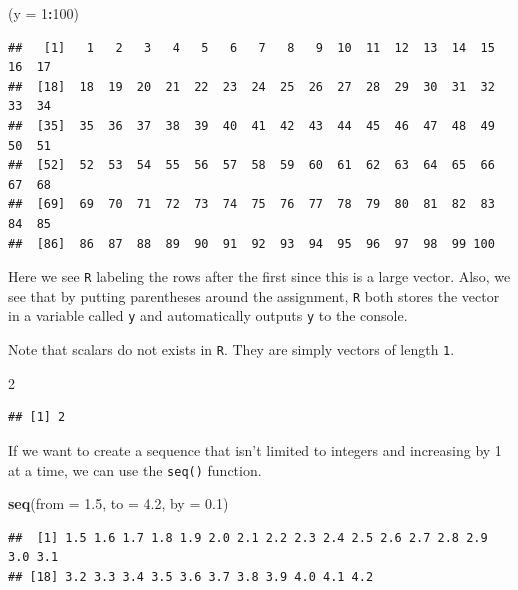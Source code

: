 \documentclass[]{book}
\newenvironment{Shaded}{\begin{snugshade}}{\end{snugshade}}
\newcommand{\KeywordTok}[1]{\textcolor[rgb]{0.13,0.29,0.53}{\textbf{#1}}}
\newcommand{\DataTypeTok}[1]{\textcolor[rgb]{0.13,0.29,0.53}{#1}}
\newcommand{\DecValTok}[1]{\textcolor[rgb]{0.00,0.00,0.81}{#1}}
\newcommand{\FloatTok}[1]{\textcolor[rgb]{0.00,0.00,0.81}{#1}}
\newcommand{\OperatorTok}[1]{\textcolor[rgb]{0.81,0.36,0.00}{\textbf{#1}}}
\newcommand{\NormalTok}[1]{#1}
\theoremstyle{definition}
\theoremstyle{definition}
\theoremstyle{definition}
\theoremstyle{remark}
\begin{document}
\begin{Shaded}
\begin{Highlighting}[]
\NormalTok{(}\DataTypeTok{y =} \DecValTok{1}\OperatorTok{:}\DecValTok{100}\NormalTok{)}
\end{Highlighting}
\end{Shaded}

\begin{verbatim}
##   [1]   1   2   3   4   5   6   7   8   9  10  11  12  13  14  15  16  17
##  [18]  18  19  20  21  22  23  24  25  26  27  28  29  30  31  32  33  34
##  [35]  35  36  37  38  39  40  41  42  43  44  45  46  47  48  49  50  51
##  [52]  52  53  54  55  56  57  58  59  60  61  62  63  64  65  66  67  68
##  [69]  69  70  71  72  73  74  75  76  77  78  79  80  81  82  83  84  85
##  [86]  86  87  88  89  90  91  92  93  94  95  96  97  98  99 100
\end{verbatim}

Here we see \texttt{R} labeling the rows after the first since this is a
large vector. Also, we see that by putting parentheses around the
assignment, \texttt{R} both stores the vector in a variable called
\texttt{y} and automatically outputs \texttt{y} to the console.

Note that scalars do not exists in \texttt{R}. They are simply vectors
of length \texttt{1}.

\begin{Shaded}
\begin{Highlighting}[]
\DecValTok{2}
\end{Highlighting}
\end{Shaded}

\begin{verbatim}
## [1] 2
\end{verbatim}

If we want to create a sequence that isn't limited to integers and
increasing by 1 at a time, we can use the \texttt{seq()} function.

\begin{Shaded}
\begin{Highlighting}[]
\KeywordTok{seq}\NormalTok{(}\DataTypeTok{from =} \FloatTok{1.5}\NormalTok{, }\DataTypeTok{to =} \FloatTok{4.2}\NormalTok{, }\DataTypeTok{by =} \FloatTok{0.1}\NormalTok{)}
\end{Highlighting}
\end{Shaded}

\begin{verbatim}
##  [1] 1.5 1.6 1.7 1.8 1.9 2.0 2.1 2.2 2.3 2.4 2.5 2.6 2.7 2.8 2.9 3.0 3.1
## [18] 3.2 3.3 3.4 3.5 3.6 3.7 3.8 3.9 4.0 4.1 4.2
\end{verbatim}
\end{document}
